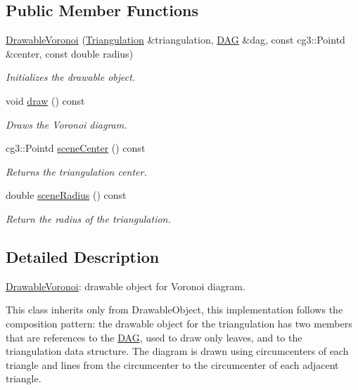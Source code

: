 \subsection*{Public Member Functions}
\begin{DoxyCompactItemize}
\item 
\hyperlink{classDrawableVoronoi_aab7fabca89392b0eb45c59b4e695855a}{Drawable\+Voronoi} (\hyperlink{classTriangulation}{Triangulation} \&triangulation, \hyperlink{classDAG}{D\+AG} \&dag, const cg3\+::\+Pointd \&center, const double radius)
\begin{DoxyCompactList}\small\item\em Initializes the drawable object. \end{DoxyCompactList}\item 
void \hyperlink{classDrawableVoronoi_aa10c214cfc42f752433c682760d88b70}{draw} () const
\begin{DoxyCompactList}\small\item\em Draws the Voronoi diagram. \end{DoxyCompactList}\item 
cg3\+::\+Pointd \hyperlink{classDrawableVoronoi_a1707c9e575880eeac9e981d73e03b3bf}{scene\+Center} () const
\begin{DoxyCompactList}\small\item\em Returns the triangulation center. \end{DoxyCompactList}\item 
double \hyperlink{classDrawableVoronoi_af26652a83c96748bf9a09abc6255672b}{scene\+Radius} () const
\begin{DoxyCompactList}\small\item\em Return the radius of the triangulation. \end{DoxyCompactList}\end{DoxyCompactItemize}


\subsection{Detailed Description}
\hyperlink{classDrawableVoronoi}{Drawable\+Voronoi}\+: drawable object for Voronoi diagram. 

This class inherits only from Drawable\+Object, this implementation follows the composition pattern\+: the drawable object for the triangulation has two members that are references to the \hyperlink{classDAG}{D\+AG}, used to draw only leaves, and to the triangulation data structure. The diagram is drawn using circumcenters of each triangle and lines from the circumcenter to the circumcenter of each adjacent triangle. 

